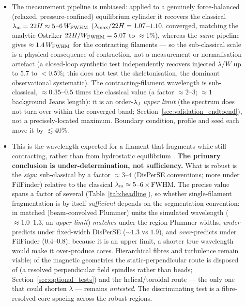 \documentclass[usenatbib,twoside,twocolumn]{mnras}
\begin{document}
\begin{itemize}
\begin{itemize}
        \item The measurement pipeline is unbiased: applied to a genuinely force-balanced (relaxed, pressure-confined) equilibrium cylinder it recovers the classical $\lambda_{\rm m}=22H\approx5$--$6\,W_{\rm FWHM}$ ($\lambda_{\rm max}/22H=1.07$--$1.10$, converged, matching the analytic Ostriker $22H/W_{\rm FWHM}=5.07$ to $\approx1\%$), whereas the \emph{same} pipeline gives $\approx1.4\,W_{\rm FWHM}$ for the contracting filaments --- so the sub-classical scale is a physical consequence of contraction, not a measurement or normalisation artefact (a closed-loop synthetic test independently recovers injected $\lambda/W$ up to $5.7$ to $<0.5\%$; this does not test the skeletonisation, the dominant observational systematic). The contracting-filament wavelength is sub-classical, $\approx0.35$--$0.5$ times the classical value (a factor $\approx2$--$3$; $\approx1$ background Jeans length): it is an order-$\lambda_{\rm J}$ \emph{upper limit} (the spectrum does not turn over within the converged band; Section~\ref{sec:validation_endtoend}), not a precisely-located maximum. Boundary condition, profile and seed each move it by $\lesssim40\%$.
        \item This is the wavelength expected for a filament that fragments while still contracting, rather than from hydrostatic equilibrium \citep{Clarke2016}. \textbf{The primary conclusion is under-determination, not sufficiency.} What is robust is the \emph{sign}: sub-classical by a factor $\approx3$--$4$ (DisPerSE conventions; more under FilFinder) relative to the classical $\lambda_{\rm m}\approx5$--$6\times$FWHM. The precise value spans a factor of several (Table~\ref{tab:headline}), so whether single-filament fragmentation is by itself \emph{sufficient} depends on the segmentation convention: in matched (beam-convolved Plummer) units the simulated wavelength ($\approx1.0$--$1.3$, an \emph{upper limit}) \emph{matches} under the region-Plummer widths, \emph{under}-predicts under fixed-width DisPerSE ($\sim1.3$ vs $1.9$), and \emph{over}-predicts under FilFinder ($0.4$--$0.8$); because it is an upper limit, a shorter true wavelength would make it over-produce cores. Hierarchical fibres and turbulence remain viable; of the magnetic geometries the static-perpendicular route is disposed of (a resolved perpendicular field spindles rather than beads; Section~\ref{sec:optional_tests}) and the helical/toroidal route --- the only one that could shorten $\lambda$ --- remains \emph{untested}. The discriminating test is a fibre-resolved core spacing across the robust regions.
    \end{itemize}


\end{itemize}
\end{document}
